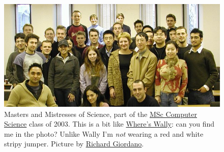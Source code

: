\documentclass[
]{book}
\begin{document}
\begin{figure}

{\centering \includegraphics[width=1\linewidth]{images/msc-2003} 

}

\caption{Masters and Mistresses of Science, part of the \href{https://web.archive.org/web/20030825205716/http://www.cs.man.ac.uk/Study_subweb/Postgrad/ACS-CS/webpages/handbook/CSHandbook.pdf}{MSc Computer Science} class of 2003. This is a bit like \href{https://en.wikipedia.org/wiki/Where\%27s_Wally\%3F}{Where's Wally}: can you find me in the photo? Unlike Wally I'm \emph{not} wearing a red and white stripy jumper. Picture by \href{https://www.southampton.ac.uk/healthsciences/about/staff/richard_giordano.page}{Richard Giordano}.}\label{fig:msc-fig}
\end{figure}
\end{document}
